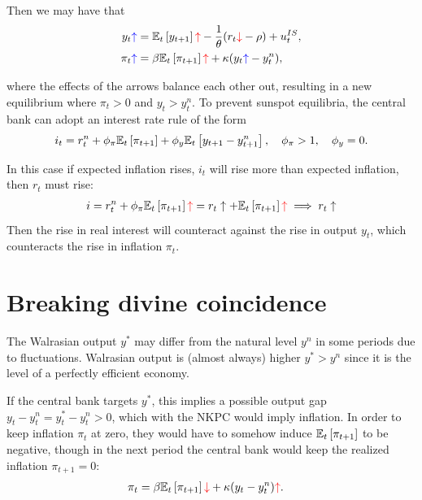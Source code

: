 \documentclass[../main.tex]{subfiles}
\begin{document}
        Then we may have that
        \begin{align}
            y_t
            \textcolor{blue}{\uparrow}
            &= \mathbb{E}_t\left[y_{t+1}\right]
            \textcolor{red}{\uparrow}
            - \frac{1}{\theta}(
                r_t
                \textcolor{red}{\downarrow}
            -\rho) + u_t^{IS},
            \\
            \pi_t
            \textcolor{blue}{\uparrow}
            &= \beta
            \mathbb{E}_t\left[\pi_{t+1}\right]
            \textcolor{red}{\uparrow}
            + \kappa (
                y_t
                \textcolor{blue}{\uparrow}
            - y^n_t),
        \end{align}
        
        where the effects of the arrows balance each other out, resulting in a new equilibrium where $\pi_t > 0$ and $y_t > y_t^n$. To prevent sunspot equilibria, the central bank can adopt an interest rate rule of the form
        \begin{align}
            i_t
            = r_t^n
            + \phi_\pi \mathbb{E}_t\left[\pi_{t+1}\right]
            + \phi_y \mathbb{E}_t\left[y_{t+1} - y_{t+1}^n\right],
            \quad \phi_\pi > 1,
            \quad \phi_y = 0.
        \end{align}
        
        In this case if expected inflation rises, $i_t$ will rise more than expected inflation, then $r_t$ must rise:
        \begin{align}
            i = r_t^n
            + \phi_\pi \mathbb{E}_t\left[\pi_{t+1}\right]
            \textcolor{red}{\uparrow}
            = r_t
            \uparrow
            + \mathbb{E}_t\left[\pi_{t+1}\right]
            \textcolor{red}{\uparrow}
            \implies
            r_t
            \uparrow
        \end{align}
        Then the rise in real interest will counteract against the rise in output $y_t$, which counteracts the rise in inflation $\pi_t$.
        
    \section{Breaking divine coincidence}
        
        The Walrasian output $y^*$ may differ from the natural level $y^n$ in some periods due to fluctuations. Walrasian output is (almost always) higher $y^* > y^n$ since it is the level of a perfectly efficient economy.
        
        \vspace{0.25cm}
        
        If the central bank targets $y^*$, this implies a possible output gap $y_t - y_t^n = y_t^* - y_t^n > 0$, which with the NKPC would imply inflation. In order to keep inflation $\pi_t$ at zero, they would have to somehow induce $\mathbb{E}_t\left[\pi_{t+1}\right]$ to be negative, though in the next period the central bank would keep the realized inflation $\pi_{t+1} = 0$:
        \begin{align}
            \pi_t
            &= \beta
            \mathbb{E}_t\left[\pi_{t+1}\right]
            \textcolor{red}{\downarrow}
            + \kappa (
                y_t
            - y^n_t)
            \textcolor{red}{\uparrow}.
        \end{align}
        
\end{document}
